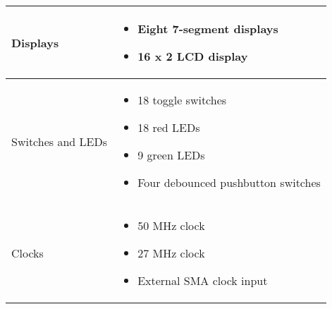 \begin{center}
\begin{longtable}{|l|p{4.75in}|}
		Displays & \begin{itemize}
					\item Eight 7-segment displays
    					\item 16 x 2 LCD display
    			 \end{itemize} \\ \hline
		Switches and LEDs & \begin{itemize}
					\item 18 toggle switches
    					\item 18 red LEDs
   					\item 9 green LEDs
   		 			\item Four debounced pushbutton switches
   				     \end{itemize} \\ \hline
		Clocks & \begin{itemize}
					\item 50 MHz clock
    					\item 27 MHz clock
   					\item External SMA clock input
   			 \end{itemize}	 \\ \hline
	\end{longtable} 
\end{center}
